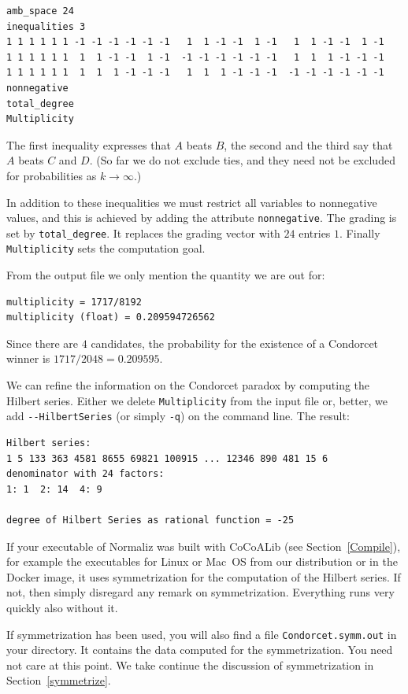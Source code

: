 \begin{Verbatim}
amb_space 24
inequalities 3
1 1 1 1 1 1 -1 -1 -1 -1 -1 -1   1  1 -1 -1  1 -1   1  1 -1 -1  1 -1
1 1 1 1 1 1  1  1 -1 -1  1 -1  -1 -1 -1 -1 -1 -1   1  1  1 -1 -1 -1
1 1 1 1 1 1  1  1  1 -1 -1 -1   1  1  1 -1 -1 -1  -1 -1 -1 -1 -1 -1
nonnegative
total_degree
Multiplicity
\end{Verbatim}
The first inequality expresses that $A$ beats $B$, the second and the third say that $A$ beats $C$ and $D$. (So far we do not exclude ties, and they need not be excluded for probabilities as $k\to\infty$.)

In addition to these inequalities we must restrict all variables to nonnegative values, and this is achieved by adding the attribute \verb|nonnegative|. The grading is set by \verb|total_degree|. It replaces the grading vector with $24$ entries $1$. Finally \verb|Multiplicity| sets the computation goal.

From the output file we only mention the quantity we are out for:
\begin{Verbatim}
multiplicity = 1717/8192
multiplicity (float) = 0.209594726562
\end{Verbatim}
Since there are $4$ candidates, the probability for the existence of a Condorcet winner is $1717/2048=0.209595$.

We can refine the information on the Condorcet paradox by computing the Hilbert series. Either we delete \verb|Multiplicity| from the input file or, better, we add \verb|--HilbertSeries| (or simply \verb|-q|) on the command line. The result:
\begin{Verbatim}
Hilbert series:
1 5 133 363 4581 8655 69821 100915 ... 12346 890 481 15 6 
denominator with 24 factors:
1: 1  2: 14  4: 9

degree of Hilbert Series as rational function = -25
\end{Verbatim}

If your executable of Normaliz was built with CoCoALib (see Section~\ref{Compile}), for example the executables for Linux or Mac~OS from our distribution or in the Docker image, it uses symmetrization for the computation of the Hilbert series. If not, then simply disregard any remark on symmetrization. Everything runs very quickly also without it.

If symmetrization has been used, you will also find a file \verb|Condorcet.symm.out| in your directory. It contains the data computed for the symmetrization. You need not care at this point. We take continue the discussion of symmetrization in Section~\ref{symmetrize}.

